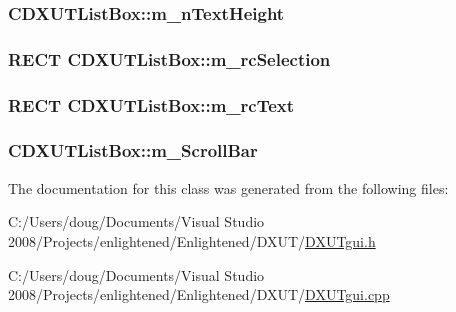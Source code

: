 \hypertarget{class_c_d_x_u_t_list_box_af21c0d22f870efc2575a16941f0c400a}{
\subsubsection[{m\_\-nTextHeight}]{ {\bf CDXUTListBox::m\_\-nTextHeight}}}
\label{class_c_d_x_u_t_list_box_af21c0d22f870efc2575a16941f0c400a}
\hypertarget{class_c_d_x_u_t_list_box_a57972e758fd19f1cd23c9e9bc41745c7}{
\subsubsection[{m\_\-rcSelection}]{\setlength{\rightskip}{0pt plus 5cm}RECT {\bf CDXUTListBox::m\_\-rcSelection}}}
\label{class_c_d_x_u_t_list_box_a57972e758fd19f1cd23c9e9bc41745c7}
\hypertarget{class_c_d_x_u_t_list_box_a2dea32bd9a82138ae549084e74b030ef}{
\subsubsection[{m\_\-rcText}]{\setlength{\rightskip}{0pt plus 5cm}RECT {\bf CDXUTListBox::m\_\-rcText}}}
\label{class_c_d_x_u_t_list_box_a2dea32bd9a82138ae549084e74b030ef}
\hypertarget{class_c_d_x_u_t_list_box_a927146f380016cfc8b580b6f540648aa}{
\subsubsection[{m\_\-ScrollBar}]{ {\bf CDXUTListBox::m\_\-ScrollBar}}}
\label{class_c_d_x_u_t_list_box_a927146f380016cfc8b580b6f540648aa}


The documentation for this class was generated from the following files:\begin{DoxyCompactItemize}
\item 
C:/Users/doug/Documents/Visual Studio 2008/Projects/enlightened/Enlightened/DXUT/\hyperlink{_d_x_u_tgui_8h}{DXUTgui.h}\item 
C:/Users/doug/Documents/Visual Studio 2008/Projects/enlightened/Enlightened/DXUT/\hyperlink{_d_x_u_tgui_8cpp}{DXUTgui.cpp}\end{DoxyCompactItemize}
